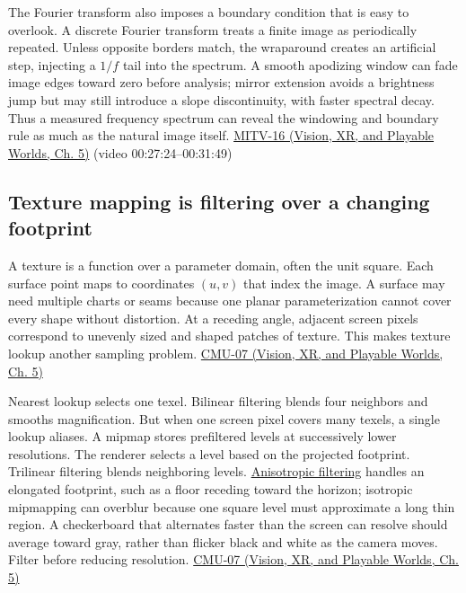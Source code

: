 The Fourier transform also imposes a boundary condition that is easy to overlook. A discrete Fourier transform treats a finite image as periodically repeated. Unless opposite borders match, the wraparound creates an artificial step, injecting a \(1/f\) tail into the spectrum. A smooth apodizing window can fade image edges toward zero before analysis; mirror extension avoids a brightness jump but may still introduce a slope discontinuity, with faster spectral decay. Thus a measured frequency spectrum can reveal the windowing and boundary rule as much as the natural image itself. \href{../07-Vision-XR-and-Playable-Worlds/main.pdf\#nameddest=04-visual-computing-ii-ch036-mitv-16---fast-convolution-low-pass-filter-approximations-integral-images-us-6457032}{MITV-16 (Vision, XR, and Playable Worlds, Ch. 5)} (video 00:27:24--00:31:49)

\subsection{Texture mapping is filtering over a changing footprint}\label{03-visual-computing-i-ch004-texture-mapping-is-filtering-over-a-changing-footprint}

\hypertarget{03-visual-computing-i-ch004-texture-mapping-is-filtering-over-a-changing-footprint}{}

A texture is a function over a parameter domain, often the unit square. Each surface point maps to coordinates \((u,v)\) that index the image. A surface may need multiple charts or seams because one planar parameterization cannot cover every shape without distortion. At a receding angle, adjacent screen pixels correspond to unevenly sized and shaped patches of texture. This makes texture lookup another sampling problem. \href{../07-Vision-XR-and-Playable-Worlds/main.pdf\#nameddest=04-visual-computing-ii-ch036-cmu-07---perspective-projection-and-texture-mapping}{CMU-07 (Vision, XR, and Playable Worlds, Ch. 5)}

Nearest lookup selects one texel. Bilinear filtering blends four neighbors and smooths magnification. But when one screen pixel covers many texels, a single lookup aliases. A mipmap stores prefiltered levels at successively lower resolutions. The renderer selects a level based on the projected footprint. Trilinear filtering blends neighboring levels. \hyperref[appendix-d5b3c692d9f0]{Anisotropic filtering} handles an elongated footprint, such as a floor receding toward the horizon; isotropic mipmapping can overblur because one square level must approximate a long thin region. A checkerboard that alternates faster than the screen can resolve should average toward gray, rather than flicker black and white as the camera moves. Filter before reducing resolution. \href{../07-Vision-XR-and-Playable-Worlds/main.pdf\#nameddest=04-visual-computing-ii-ch036-cmu-07---perspective-projection-and-texture-mapping}{CMU-07 (Vision, XR, and Playable Worlds, Ch. 5)}

